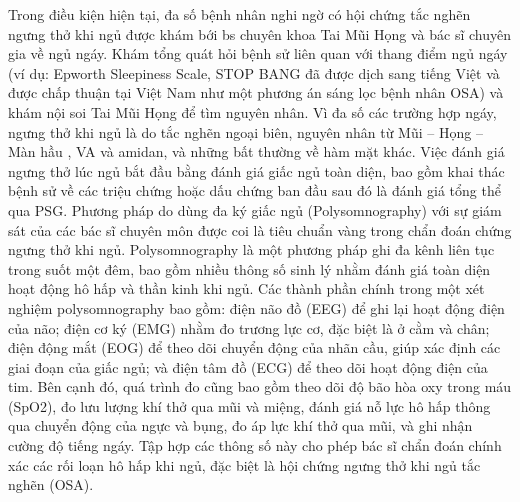 Trong điều kiện hiện tại, đa số bệnh nhân nghi ngờ có hội chứng tắc nghẽn ngưng thở khi ngủ được khám bới bs chuyên khoa Tai Mũi Họng và bác sĩ chuyên gia về ngủ ngáy. Khám tổng quát hỏi bệnh sử liên quan với thang điểm ngủ ngáy (ví dụ: Epworth Sleepiness Scale, STOP BANG đã được dịch sang tiếng Việt và được chấp thuận tại Việt Nam như một phương án sáng lọc bệnh nhân OSA) và khám nội soi Tai Mũi Họng để tìm nguyên nhân. Vì đa số các trường hợp ngáy, ngưng thở khi ngủ là do tắc nghẽn ngoại biên, nguyên nhân từ Mũi – Họng – Màn hầu , VA và amidan, và những bất thường về hàm mặt khác. Việc đánh giá ngưng thở lúc ngủ bắt đầu bằng đánh giá giấc ngủ toàn diện, bao gồm khai thác bệnh sử về các triệu chứng hoặc dấu chứng ban đầu sau đó là đánh giá tổng thể qua PSG\cite{diagnosis_osa}\cite{medical2006polysomnography}.
Phương pháp do dùng đa ký giấc ngủ (Polysomnography) với sự giám sát của các bác sĩ chuyên môn được coi là tiêu chuẩn vàng trong chẩn đoán chứng ngưng thở khi ngủ. Polysomnography là một phương pháp ghi đa kênh liên tục trong suốt một đêm, bao gồm nhiều thông số sinh lý nhằm đánh giá toàn diện hoạt động hô hấp và thần kinh khi ngủ. Các thành phần chính trong một xét nghiệm polysomnography bao gồm: điện não đồ (EEG) để ghi lại hoạt động điện của não; điện cơ ký (EMG) nhằm đo trương lực cơ, đặc biệt là ở cằm và chân; điện động mắt (EOG) để theo dõi chuyển động của nhãn cầu, giúp xác định các giai đoạn của giấc ngủ; và điện tâm đồ (ECG) để theo dõi hoạt động điện của tim. Bên cạnh đó, quá trình đo cũng bao gồm theo dõi độ bão hòa oxy trong máu (SpO2), đo lưu lượng khí thở qua mũi và miệng, đánh giá nỗ lực hô hấp thông qua chuyển động của ngực và bụng, đo áp lực khí thở qua mũi, và ghi nhận cường độ tiếng ngáy. Tập hợp các thông số này cho phép bác sĩ chẩn đoán chính xác các rối loạn hô hấp khi ngủ, đặc biệt là hội chứng ngưng thở khi ngủ tắc nghẽn (OSA).

